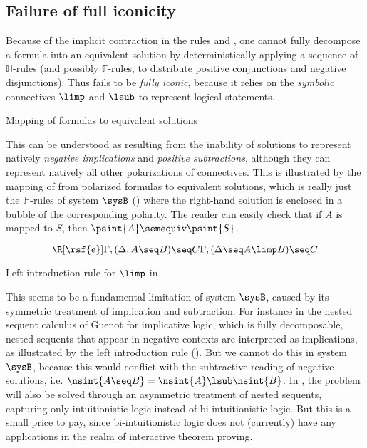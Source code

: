 \subsection{Failure of full iconicity}

Because of the implicit contraction in the rules \rsf{{\limp}{-}} and
\rsf{{\lsub}{+}}, one cannot fully decompose a formula into an equivalent
solution by deterministically applying a sequence of $\mathbb{H}$-rules (and
possibly $\mathbb{F}$-rules, to distribute positive conjunctions and negative
disjunctions). Thus  fails to be \emph{fully iconic}, because it
relies on the \emph{symbolic} connectives $\limp$ and $\lsub$ to represent
logical statements.

\begin{marginfigure}
  
  \caption{Mapping of formulas to equivalent solutions}
\end{marginfigure}

This can be understood as resulting from the inability of solutions to represent
natively \emph{negative implications} and \emph{positive subtractions}, although
they can represent natively all other polarizations of connectives. This is
illustrated by the mapping of  from polarized formulas to
equivalent solutions, which is really just the $\mathbb{H}$-rules of system
$\sysB$ () where the right-hand solution is enclosed in a
bubble of the corresponding polarity. The reader can easily check that if $A$ is
mapped to $S$, then $\psint{A} \semequiv \psint{S}$.

\begin{marginfigure}
  $$
  \R[\rsf{e}]
    {\Gamma, (\Delta, A \seq B) \seq C}
    {\Gamma, (\Delta \seq A \limp B) \seq C}
  $$
  \caption{Left introduction rule for $\limp$ in }
\end{marginfigure}

This seems to be a fundamental limitation of system $\sysB$, caused by its
symmetric treatment of implication and subtraction. For instance in the nested
sequent calculus  of Guenot for implicative logic, which is fully decomposable, nested
sequents that appear in negative contexts are interpreted as implications, as
illustrated by the left introduction rule  (). But we
cannot do this in system $\sysB$, because this would conflict with the
subtractive reading of negative solutions, i.e. $\nsint{A \seq B} = \nsint{A}
\lsub \nsint{B}$. In , the problem will also be solved through an
asymmetric treatment of nested sequents, capturing only intuitionistic logic
instead of bi-intuitionistic logic. But this is a small price to pay, since
bi-intuitionistic logic does not (currently) have any applications in the realm
of interactive theorem proving.